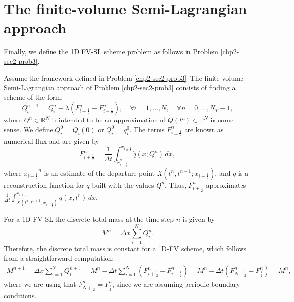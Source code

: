 \section{The finite-volume Semi-Lagrangian approach}
\label{chp2-sec2-fvsl}
Finally, we define the 1D FV-SL scheme problem as follows in Problem \ref{chp2-sec2-prob3}.
\begin{prob}[1D FV-SL scheme]
	\label{chp2-sec2-prob4}
	Assume the framework defined in Problem \ref{chp2-sec2-prob3}.
	The finite-volume Semi-Lagrangian approach of Problem \ref{chp2-sec2-prob3}
	consists of finding a scheme of the form:
	\begin{equation}
		\label{1d-fv-scheme}
		{Q}_{i}^{n+1} = {Q}_{i}^{n} -
		\lambda({F}_{i+\frac{1}{2}}^{n} - {F}_{i-\frac{1}{2}}^{n}),
		\quad \forall i = 1, \ldots, N,
		\quad \forall n = 0, \ldots, N_T-1,
	\end{equation}
	where ${Q}^{n} \in \mathbb{R}^{N}$ is intended to be an approximation
	of ${Q}(t^{n})\in \mathbb{R}^{N}$ in some sense. We define
	${Q}_{i}^{0} = {Q}_i(0)$ or ${Q}_{i}^{0} = {q}^{0}_{i}$.
	The terms ${F}_{i\pm\frac{1}{2}}^{n}$ are known as numerical flux and are given by
	\begin{equation}
		{F}_{i\pm\frac{1}{2}}^{n} =
		\frac{1}{\Delta t}
		\int_{\tilde{x}_{i\pm\frac{1}{2}}^n}^{x_{i\pm\frac{1}{2}}}\tilde{q}(x; Q^n) \,dx,
	\end{equation}
	where ${\tilde{x}_{i\pm\frac{1}{2}}}^n$ is an estimate of the departure point $X(t^n,t^{n+1};x_{i\pm \frac{1}{2}})$,
	and $\tilde{q}$ is a reconstruction function for $q$ built with the values $Q^n$.
	Thus, ${F}_{i\pm\frac{1}{2}}^{n}$ approximates
	$\frac{1}{\Delta t} \int_{X(t^n,t^{n+1};x_{i\pm \frac{1}{2}})}^{x_{i\pm \frac{1}{2}}}{q}(x, t^n) \,dx$.
\end{prob}
For a 1D FV-SL the discrete total mass at the time-step $n$ is given by
\begin{equation}
	\label{1d-fv-mass}
	M^n =  \Delta x \sum_{i=1}^N Q_i^n.
\end{equation}
Therefore, the discrete total mass is constant for a 1D-FV scheme,
which follows from a straightforward computation:
\begin{align*}
	M^{n+1} =  \Delta x \sum_{i=1}^N Q_i^{n+1}
					= M^{n} - \Delta t  \sum_{i=1}^N (F^n_{i+\frac{1}{2}}- F^n_{i-\frac{1}{2}})
					= M^{n} - \Delta t (F^n_{N+\frac{1}{2}}- F^n_{\frac{1}{2}})
					= M^{n},
\end{align*}
where we are using that $F^n_{N+\frac{1}{2}} = F^n_{\frac{1}{2}}$, since we are assuming periodic boundary
conditions.

